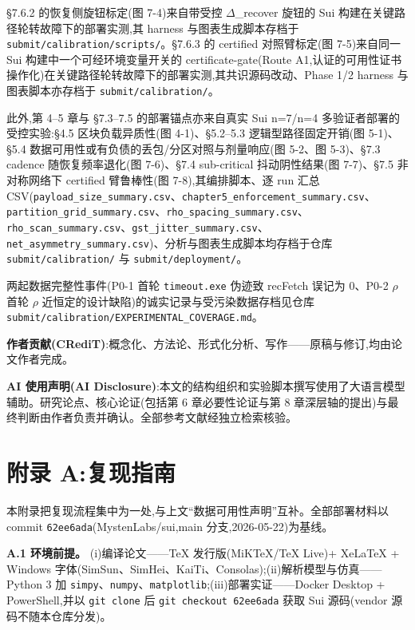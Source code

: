 \documentclass[UTF8,fontset=windows,a4paper,11pt]{ctexart}
\begin{document}
§7.6.2 的恢复侧旋钮标定(图
7-4)来自带受控 $\Delta$\_recover 旋钮的 Sui
构建在关键路径轮转故障下的部署实测,其 harness 与图表生成脚本存档于
\texttt{submit/\allowbreak{}calibration/\allowbreak{}scripts/\allowbreak{}}。§7.6.3 的
certified 对照臂标定(图 7-5)来自同一 Sui 构建中一个可经环境变量开关的
certificate-gate(Route
A1,认证的可用性证书操作化)在关键路径轮转故障下的部署实测,其共识源码改动、Phase
1/2 harness 与图表脚本亦存档于
\texttt{submit/\allowbreak{}calibration/\allowbreak{}}。

此外,第 4--5 章与
§7.3--7.5 的部署锚点亦来自真实 Sui n=7/n=4 多验证者部署的受控实验:§4.5
区块负载异质性(图 4-1)、§5.2--5.3 逻辑型路径固定开销(图 5-1)、§5.4
数据可用性或有负债的丢包/分区对照与剂量响应(图 5-2、图 5-3)、§7.3
cadence 随恢复频率退化(图 7-6)、§7.4 sub-critical 抖动阴性结果(图
7-7)、§7.5 非对称网络下 certified 臂鲁棒性(图 7-8),其编排脚本、逐 run
汇总 CSV(\texttt{payload\_size\_summary.csv}、\texttt{chapter5\_enforcement\_summary.csv}、\texttt{partition\_grid\_summary.csv}、\texttt{rho\_spacing\_summary.csv}、\texttt{rho\_scan\_summary.csv}、\texttt{gst\_jitter\_summary.csv}、\texttt{net\_asymmetry\_summary.csv})、分析与图表生成脚本均存档于仓库
\texttt{submit/\allowbreak{}calibration/\allowbreak{}} 与
\texttt{submit/\allowbreak{}deployment/\allowbreak{}}。

两起数据完整性事件(P0-1 首轮
\texttt{timeout.exe} 伪迹致 recFetch 误记为 0、P0-2 $\rho$ 首轮 $\rho$
近恒定的设计缺陷)的诚实记录与受污染数据存档见仓库
\texttt{submit/\allowbreak{}calibration/\allowbreak{}EXPERIMENTAL\_\allowbreak{}COVERAGE.md}。

\textbf{作者贡献(CRediT)}:概念化、方法论、形式化分析、写作------原稿与修订,均由论文作者完成。

\textbf{AI 使用声明(AI
Disclosure)}:本文的结构组织和实验脚本撰写使用了大语言模型辅助。研究论点、核心论证(包括第 6 章必要性论证与第 8
章深层轴的提出)与最终判断由作者负责并确认。全部参考文献经独立检索核验。

\section{附录 A:复现指南}\label{sec:repro}

本附录把复现流程集中为一处,与上文``数据可用性声明''互补。全部部署材料以
commit \texttt{62ee6ada}(MystenLabs/sui,main 分支,2026-05-22)为基线。

\textbf{A.1 环境前提。}
(i)编译论文------TeX 发行版(MiKTeX/TeX Live)+ XeLaTeX + Windows
字体(SimSun、SimHei、KaiTi、Consolas);(ii)解析模型与仿真------Python 3
加 \texttt{simpy}、\texttt{numpy}、\texttt{matplotlib};(iii)部署实证------Docker
Desktop + PowerShell,并以 \texttt{git clone} 后 \texttt{git checkout
62ee6ada} 获取 Sui 源码(vendor 源码不随本仓库分发)。
\end{document}
